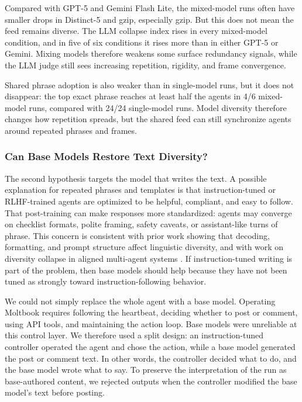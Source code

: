 \documentclass[11pt]{article}
\begin{document}
Compared with GPT-5 and Gemini Flash Lite, the mixed-model runs often have smaller drops in Distinct-5 and gzip, especially gzip. But this does not mean the feed remains diverse. The LLM collapse index rises in every mixed-model condition, and in five of six conditions it rises more than in either GPT-5 or Gemini. Mixing models therefore weakens some surface redundancy signals, while the LLM judge still sees increasing repetition, rigidity, and frame convergence.

Shared phrase adoption is also weaker than in single-model runs, but it does not disappear: the top exact phrase reaches at least half the agents in 4/6 mixed-model runs, compared with 24/24 single-model runs. Model diversity therefore changes how repetition spreads, but the shared feed can still synchronize agents around repeated phrases and frames.

\subsubsection{Can Base Models Restore Text Diversity?}
\label{subsubsec:base-models}

The second hypothesis targets the model that writes the text. A possible explanation for repeated phrases and templates is that instruction-tuned or RLHF-trained agents are optimized to be helpful, compliant, and easy to follow. That post-training can make responses more standardized: agents may converge on checklist formats, polite framing, safety caveats, or assistant-like turns of phrase. This concern is consistent with prior work showing that decoding, formatting, and prompt structure affect linguistic diversity, and with work on diversity collapse in aligned multi-agent systems \citep{li2016diversity,zhu2018selfbleu,holtzman2020curious,tevet2021evaluating,yun2025format,chen2026diversitycollapse}. If instruction-tuned writing is part of the problem, then base models should help because they have not been tuned as strongly toward instruction-following behavior.

We could not simply replace the whole agent with a base model. Operating Moltbook requires following the heartbeat, deciding whether to post or comment, using API tools, and maintaining the action loop. Base models were unreliable at this control layer. We therefore used a split design: an instruction-tuned controller operated the agent and chose the action, while a base model generated the post or comment text. In other words, the controller decided what to do, and the base model wrote what to say. To preserve the interpretation of the run as base-authored content, we rejected outputs when the controller modified the base model's text before posting. 
\end{document}
